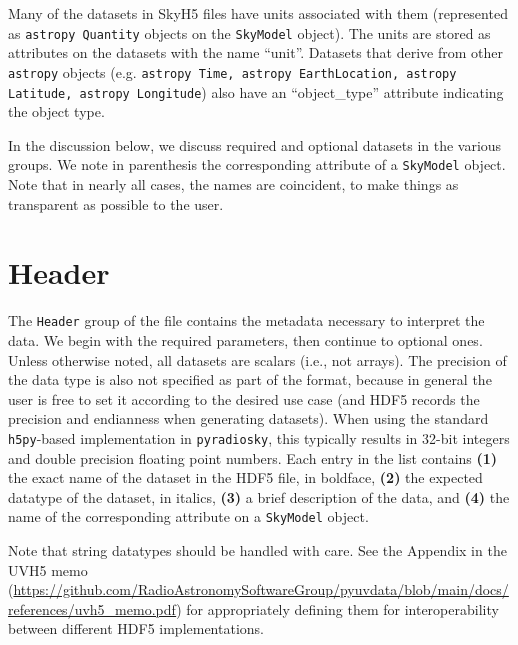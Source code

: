 \documentclass[11pt, oneside]{article}
\begin{document}
Many of the datasets in SkyH5 files have units associated with them (represented as \texttt{astropy Quantity} objects on the \texttt{SkyModel} object).
The units are stored as attributes on the datasets with the name ``unit''.
Datasets that derive from other \texttt{astropy} objects (e.g. \texttt{astropy Time,
astropy EarthLocation, astropy Latitude, astropy Longitude})
also have an ``object\_type'' attribute indicating the object type.

In the discussion below, we discuss required and optional datasets in the
various groups. We note in parenthesis the corresponding attribute of a \texttt{SkyModel}
object. Note that in nearly all cases, the names are coincident, to make things
as transparent as possible to the user.

\section{Header}
\label{sec:header}
The \texttt{Header} group of the file contains the metadata necessary to interpret
the data. We begin with the required parameters, then continue to optional
ones. Unless otherwise noted, all datasets are scalars (i.e., not arrays). The
precision of the data type is also not specified as part of the format, because
in general the user is free to set it according to the desired use case (and
HDF5 records the precision and endianness when generating datasets). When using
the standard \texttt{h5py}-based implementation in \texttt{pyradiosky}, this typically
results in 32-bit integers and double precision floating point numbers. Each
entry in the list contains \textbf{(1)} the exact name of the dataset in the
HDF5 file, in boldface, \textbf{(2)} the expected datatype of the dataset, in
italics, \textbf{(3)} a brief description of the data, and \textbf{(4)} the name
of the corresponding attribute on a \texttt{SkyModel} object.

Note that string datatypes should be handled with care. See
the Appendix in the UVH5 memo (\url{https://github.com/RadioAstronomySoftwareGroup/pyuvdata/blob/main/docs/references/uvh5_memo.pdf})
for appropriately defining them for interoperability between different HDF5 implementations.
\end{document}
